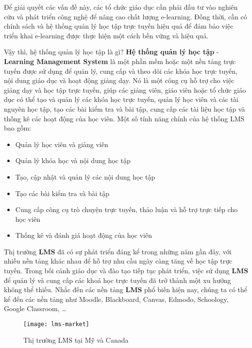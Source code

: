 \documentclass[../Thesis.tex]{subfiles}
\begin{document}
Để giải quyết các vấn đề này, các tổ chức giáo dục cần phải đầu tư vào nghiên cứu và phát triển công nghệ để nâng cao chất lượng e-learning. Đồng thời, cần có chính sách và hệ thống quản lý học tập trực tuyến hiệu quả để đảm bảo việc triển khai e-learning được thực hiện một cách bền vững và hiệu quả.

Vậy thì, hệ thống quản lý học tập là gì? \textbf{Hệ thống quản lý học tập} - \textbf{Learning Management System} là một phần mềm hoặc một nền tảng trực tuyến được sử dụng để quản lý, cung cấp và theo dõi các khóa học trực tuyến, nội dung giáo dục và hoạt động giảng dạy. Nó là một công cụ hỗ trợ cho việc giảng dạy và học tập trực tuyến, giúp các giảng viên, giáo viên hoặc tổ chức giáo dục có thể tạo và quản lý các khóa học trực tuyến, quản lý học viên và các tài nguyên học tập, tạo các bài kiểm tra và bài tập, cung cấp các tài liệu học tập và thống kê các hoạt động của học viên.
Một số tính năng chính của hệ thống LMS bao gồm:
\begin{itemize}
    \item Quản lý học viên và giảng viên
    \item Quản lý khóa học và nội dung học tập
    \item Tạo, cập nhật và quản lý các nội dung học tập
    \item Tạo các bài kiểm tra và bài tập
    \item Cung cấp công cụ trò chuyện trực tuyến, thảo luận và hỗ trợ trực tiếp cho học viên
    \item Thống kê và đánh giá hoạt động của học viên
\end{itemize}

Thị trường \textbf{LMS} đã có sự phát triển đáng kể trong những năm gần đây, với nhiều nền tảng khác nhau để hỗ trợ nhu cầu ngày
càng tăng về học tập trực tuyến. Trong bối cảnh giáo dục và đào tạo tiếp tục phát triển, việc sử dụng \textbf{LMS} để quản lý và cung cấp các khoá
học trực tuyến đã trở thành một xu hướng không thể thiếu. Nhắc đến các nền tảng \textbf{LMS} phổ biến hiện nay, chúng ta có thể kể đến các nền tảng như Moodle, Blackboard, Canvas, Edmodo, Schoology, Google Classroom, …

\begin{figure}[ht!]
\centering\texttt{[image: lms-market]}
\caption{Thị trường LMS tại Mỹ và Canada}
\label{fig:lms-market}
\end{figure}
\end{document}
